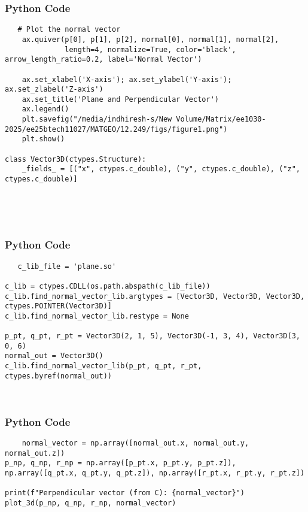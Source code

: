 \documentclass{beamer}
\begin{document}
    \begin{frame}[fragile]
        \frametitle{Python Code}
        \begin{lstlisting}
   # Plot the normal vector
    ax.quiver(p[0], p[1], p[2], normal[0], normal[1], normal[2],
              length=4, normalize=True, color='black', arrow_length_ratio=0.2, label='Normal Vector')

    ax.set_xlabel('X-axis'); ax.set_ylabel('Y-axis'); ax.set_zlabel('Z-axis')
    ax.set_title('Plane and Perpendicular Vector')
    ax.legend()
    plt.savefig("/media/indhiresh-s/New Volume/Matrix/ee1030-2025/ee25btech11027/MATGEO/12.249/figs/figure1.png")
    plt.show()

class Vector3D(ctypes.Structure):
    _fields_ = [("x", ctypes.c_double), ("y", ctypes.c_double), ("z", ctypes.c_double)]



   
        \end{lstlisting}
    \end{frame}
    
    \begin{frame}[fragile]
        \frametitle{Python Code}
        \begin{lstlisting}
   c_lib_file = 'plane.so'

c_lib = ctypes.CDLL(os.path.abspath(c_lib_file))
c_lib.find_normal_vector_lib.argtypes = [Vector3D, Vector3D, Vector3D, ctypes.POINTER(Vector3D)]
c_lib.find_normal_vector_lib.restype = None

p_pt, q_pt, r_pt = Vector3D(2, 1, 5), Vector3D(-1, 3, 4), Vector3D(3, 0, 6)
normal_out = Vector3D()
c_lib.find_normal_vector_lib(p_pt, q_pt, r_pt, ctypes.byref(normal_out))



        \end{lstlisting}
    \end{frame}

    \begin{frame}[fragile]
        \frametitle{Python Code}
        \begin{lstlisting}
    normal_vector = np.array([normal_out.x, normal_out.y, normal_out.z])
p_np, q_np, r_np = np.array([p_pt.x, p_pt.y, p_pt.z]), np.array([q_pt.x, q_pt.y, q_pt.z]), np.array([r_pt.x, r_pt.y, r_pt.z])

print(f"Perpendicular vector (from C): {normal_vector}")
plot_3d(p_np, q_np, r_np, normal_vector)

   
        \end{lstlisting}
    \end{frame}

    
    
    
\end{document}
